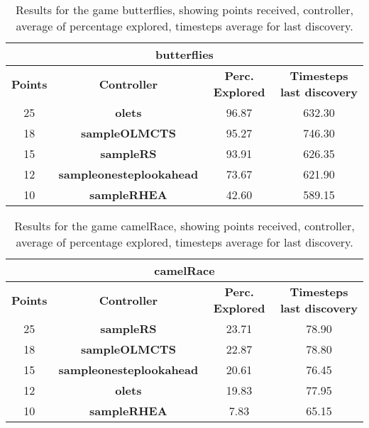 \begin{table*}[!t]
\begin{center}
\begin{tabular}{|c|c|c|c|}
\multicolumn{4}{c}{\textbf{butterflies}}\\
\hline
\textbf{Points} & \textbf{Controller} & \textbf{Perc. Explored} &  \textbf{Timesteps last discovery}\\
\hline
25 & \textbf{olets} & 96.87 & 632.30
 \\
\hline
18 & \textbf{sampleOLMCTS} & 95.27 & 746.30
 \\
\hline
15 & \textbf{sampleRS} & 93.91 & 626.35
 \\
\hline
12 & \textbf{sampleonesteplookahead} & 73.67 & 621.90
 \\
\hline
10 & \textbf{sampleRHEA} & 42.60 & 589.15
 \\
\hline
\end{tabular}
\caption{Results for the game butterflies, showing points received, controller, average of percentage explored, timesteps average for last discovery.}
\label{tab:weights}
\end{center}
\end{table*}
\begin{table*}[!t]
\begin{center}
\begin{tabular}{|c|c|c|c|}
\multicolumn{4}{c}{\textbf{camelRace}}\\
\hline
\textbf{Points} & \textbf{Controller} & \textbf{Perc. Explored} &  \textbf{Timesteps last discovery}\\
\hline
25 & \textbf{sampleRS} & 23.71 & 78.90
 \\
\hline
18 & \textbf{sampleOLMCTS} & 22.87 & 78.80
 \\
\hline
15 & \textbf{sampleonesteplookahead} & 20.61 & 76.45
 \\
\hline
12 & \textbf{olets} & 19.83 & 77.95
 \\
\hline
10 & \textbf{sampleRHEA} & 7.83 & 65.15
 \\
\hline
\end{tabular}
\caption{Results for the game camelRace, showing points received, controller, average of percentage explored, timesteps average for last discovery.}
\label{tab:weights}
\end{center}
\end{table*}
